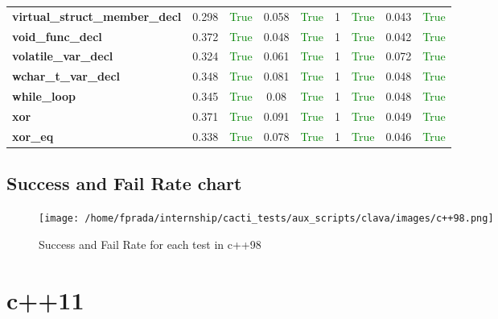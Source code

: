 \documentclass{article}
\begin{document}
\begin{xltabular}{\textwidth}{lcccccccc}
\textbf{{\fontsize{10}{12}\selectfont virtual\_struct\_member\_decl}}& 0.298&\textcolor{green}{True}& 0.058&\textcolor{green}{True}& 1&\textcolor{green}{True}& 0.043&\textcolor{green}{True} \\[0.5ex]
\textbf{{\fontsize{10}{12}\selectfont void\_func\_decl}}& 0.372&\textcolor{green}{True}& 0.048&\textcolor{green}{True}& 1&\textcolor{green}{True}& 0.042&\textcolor{green}{True} \\[0.5ex]
\textbf{{\fontsize{10}{12}\selectfont volatile\_var\_decl}}& 0.324&\textcolor{green}{True}& 0.061&\textcolor{green}{True}& 1&\textcolor{green}{True}& 0.072&\textcolor{green}{True} \\[0.5ex]
\textbf{{\fontsize{10}{12}\selectfont wchar\_t\_var\_decl}}& 0.348&\textcolor{green}{True}& 0.081&\textcolor{green}{True}& 1&\textcolor{green}{True}& 0.048&\textcolor{green}{True} \\[0.5ex]
\textbf{{\fontsize{10}{12}\selectfont while\_loop}}& 0.345&\textcolor{green}{True}& 0.08&\textcolor{green}{True}& 1&\textcolor{green}{True}& 0.048&\textcolor{green}{True} \\[0.5ex]
\textbf{{\fontsize{10}{12}\selectfont xor}}& 0.371&\textcolor{green}{True}& 0.091&\textcolor{green}{True}& 1&\textcolor{green}{True}& 0.049&\textcolor{green}{True} \\[0.5ex]
\textbf{{\fontsize{10}{12}\selectfont xor\_eq}}& 0.338&\textcolor{green}{True}& 0.078&\textcolor{green}{True}& 1&\textcolor{green}{True}& 0.046&\textcolor{green}{True} \\[0.5ex]
\bottomrule
\end{xltabular}
\newpage
\subsection{Success and Fail Rate chart}
\begin{figure}[h!]
\centering
\texttt{[image: /home/fprada/internship/cacti\_tests/aux\_scripts/clava/images/c++98.png]}
\caption{Success and Fail Rate for each test in c++98}
\label{fig:c++98}
\end{figure}
\newpage
\section{c++11}
\end{document}
